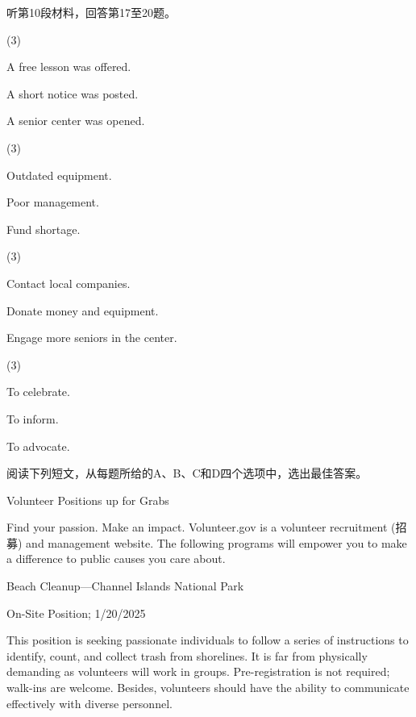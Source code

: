 \documentclass{英语试卷}
\begin{document}
\par 听第10段材料，回答第17至20题。\par
{}
\begin{choices}(3)
  \item A free lesson was offered.
  \item A short notice was posted.
  \item A senior center was opened.
\end{choices}
\begin{choices}(3)
  \item Outdated equipment.
  \item Poor management.
  \item Fund shortage.
\end{choices}
\begin{choices}(3)
  \item Contact local companies.
  \item Donate money and equipment.
  \item Engage more seniors in the center.
\end{choices}
\begin{choices}(3)
  \item To celebrate.
  \item To inform.
  \item To advocate.
\end{choices}
\par 阅读下列短文，从每题所给的A、B、C和D四个选项中，选出最佳答案。\par
{}
\par Volunteer Positions up for Grabs\par
\par Find your passion. Make an impact. Volunteer.gov is a volunteer recruitment (招募) and management website. The following programs will empower you to make a difference to public causes you care about.\par
\par Beach Cleanup—Channel Islands National Park\par
\par On-Site Position; 1/20/2025\par
\par This position is seeking passionate individuals to follow a series of instructions to identify, count, and collect trash from shorelines. It is far from physically demanding as volunteers will work in groups. Pre-registration is not required; walk-ins are welcome. Besides, volunteers should have the ability to communicate effectively with diverse personnel.\par
\end{document}

